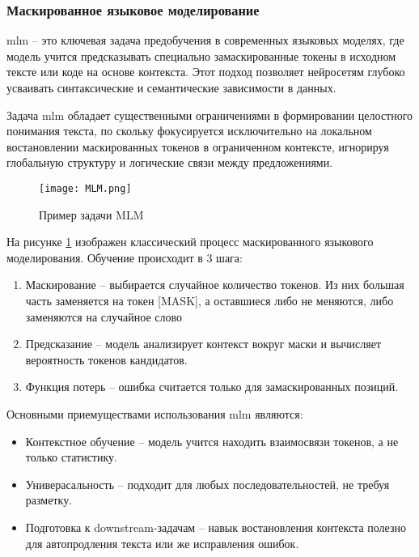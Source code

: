 \documentclass[../part_1.tex]{subfiles}
\begin{document}
\subsubsection{Маскированное языковое моделирование}
\par \acrfull{mlm} -- это ключевая задача предобучения в современных языковых моделях, где модель учится предсказывать специально замаскированные токены в исходном тексте или коде на основе контекста. Этот подход позволяет нейросетям глубоко усваивать синтаксические и семантические зависимости в данных.
\par Задача \acrshort{mlm} обладает существенными ограничениями в формировании целостного понимания текста, по скольку фокусируется исключительно на локальном востановлении маскированных токенов в ограниченном контексте, игнорируя глобальную структуру и логические связи между предложениями.
\begin{figure}[h]
    \centering
    \texttt{[image: MLM.png]}
    \caption{Пример задачи MLM}
    \label{fig:mlm_bert}
\end{figure}
\par На рисунке \ref{fig:mlm_bert} изображен классический процесс маскированного языкового моделирования. Обучение происходит в 3 шага:
\begin{enumerate}
    \item Маскирование -- выбирается случайное количество токенов. Из них большая часть заменяется на токен [MASK], а оставшиеся либо не меняются, либо заменяются на случайное слово
    \item Предсказание -- модель анализирует контекст вокруг маски и вычисляет вероятность токенов кандидатов.
    \item Функция потерь -- ошибка считается только для замаскированных позиций.
\end{enumerate}
\par Основными приемуществами использования \acrshort{mlm} являются:
\begin{itemize}
    \item Контекстное обучение -- модель учится находить взаимосвязи токенов, а не только статистику.
    \item Универасальность -- подходит для любых последовательностей, не требуя разметку.
    \item Подготовка к downstream-задачам -- навык востановления контекста полезно для автопродления текста или же исправления ошибок.
\end{itemize}
\end{document}

